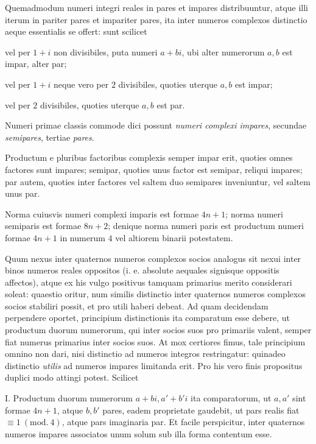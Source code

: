 Quemadmodum numeri integri reales in pares et impares distribuuntur, atque illi iterum in pariter pares et impariter pares, ita inter numeros complexos distinctio aeque essentialis se offert: sunt scilicet

vel per $1+i$ non divisibiles, puta numeri $a+bi$, ubi alter numerorum $a,b$ est impar, alter par;

vel per $1+i$ neque vero per $2$ divisibiles, quoties uterque $a,b$ est impar;

vel per $2$ divisibiles, quoties uterque $a,b$ est par.

Numeri primae classis commode dici possunt \emph{numeri complexi impares}, secundae \emph{semipares}, tertiae \emph{pares}.

Productum e pluribus factoribus complexis semper impar erit, quoties omnes factores sunt impares; semipar, quoties unus factor est semipar, reliqui impares; par autem, quoties inter factores vel saltem duo semipares inveniuntur, vel saltem unus par.

Norma cuiusvis numeri complexi imparis est formae $4n+1$; norma numeri semiparis est formae $8n+2$; denique norma numeri paris est productum numeri formae $4n+1$ in numerum $4$ vel altiorem binarii potestatem.

Quum nexus inter quaternos numeros complexos socios analogus sit nexui inter binos numeros reales oppositos (i. e. absolute aequales signisque oppositis affectos), atque ex his vulgo positivus tamquam primarius merito considerari soleat:
%
quaestio oritur, num similis distinctio inter quaternos numeros complexos socios stabiliri possit, et pro utili haberi debeat. Ad quam decidendam perpendere oportet, principium distinctionis ita comparatum esse debere, ut productum duorum numerorum, qui inter socios suos pro primariis valent, semper fiat numerus primarius inter socios suos. At mox certiores fimus, tale principium omnino non dari, nisi distinctio ad numeros integros restringatur: quinadeo distinctio \emph{utilis} ad numeros impares limitanda erit. Pro his vero finis propositus duplici modo attingi potest. Scilicet

I. Productum duorum numerorum $a+bi,a'+b'i$ ita comparatorum, ut $a,a'$ sint formae $4n+1$, atque $b,b'$ pares, eadem proprietate gaudebit, ut pars realis fiat $\equiv1\ (\mathrm{mod.}\ 4)$, atque pars imaginaria par. Et facile perspicitur, inter quaternos numeros impares associatos unum solum sub illa forma contentum esse.


